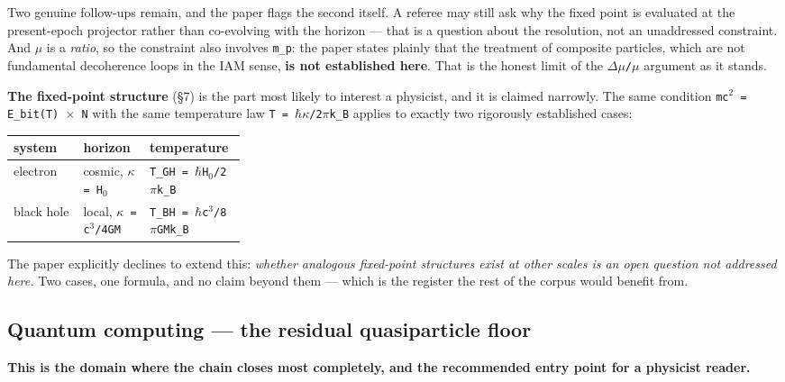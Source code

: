 \documentclass[12pt,a4paper]{article}
\begin{document}
Two genuine follow-ups remain, and the paper flags the second itself. A referee may still ask why the fixed point is evaluated at the present-epoch projector rather than co-evolving with the horizon --- that is a question about the resolution, not an unaddressed constraint. And \texttt{$\mu$} is a \textit{ratio}, so the constraint also involves \texttt{m\_p}: the paper states plainly that the treatment of composite particles, which are not fundamental decoherence loops in the IAM sense, \textbf{is not established here}. That is the honest limit of the \texttt{$\Delta\mu$/$\mu$} argument as it stands.


\textbf{The fixed-point structure} (\S7) is the part most likely to interest a physicist, and it is claimed narrowly. The same condition \texttt{mc$^{2}$ = E\_bit(T) $\times$ N} with the same temperature law \texttt{T = $\hbar\kappa$/2$\pi$k\_B} applies to exactly two rigorously established cases:


\begin{small}
\begin{tabularx}{\linewidth}{L{0.30\linewidth}YY}
\toprule
\textbf{system} & \textbf{horizon} & \textbf{temperature} \\
\midrule
electron & cosmic, \texttt{$\kappa$ = H$_{0}$} & \texttt{T\_\allowbreak{}GH = $\hbar$H$_{0}$/\allowbreak{}2$\pi$k\_\allowbreak{}B} \\
black hole & local, \texttt{$\kappa$ = c$^{3}$/\allowbreak{}4GM} & \texttt{T\_\allowbreak{}BH = $\hbar$c$^{3}$/\allowbreak{}8$\pi$GMk\_\allowbreak{}B} \\
\bottomrule
\end{tabularx}
\end{small}


The paper explicitly declines to extend this: \textit{whether analogous fixed-point structures exist at other scales is an open question not addressed here.} Two cases, one formula, and no claim beyond them --- which is the register the rest of the corpus would benefit from.





\subsection{Quantum computing --- the residual quasiparticle floor}
\label{sec:qc}

\textbf{This is the domain where the chain closes most completely, and the recommended entry point for a physicist reader.}
\end{document}
